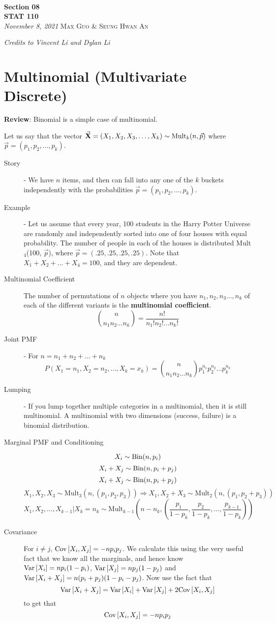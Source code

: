 \documentclass[11pt]{article}
\theoremstyle{definition}
\theoremstyle{remark}
\newcommand{\cov}[2]{\textnormal{Cov}\left[ #1, #2 \right]}
\renewcommand{\var}[1]{\textnormal{Var}\left[ #1 \right]}
\newcommand{\Bin}{\textnormal{Bin}}
\newcommand{\Mult}{\textrm{Mult}}
\newcommand{\inserttitle}{Section 08}
\newcommand{\insertauthor}{Max Guo \& Seung Hwan An}
\newcommand{\insertcourse}{STAT 110}
\begin{document}
{\noindent\Huge\bf  \\[0.1\baselineskip] {\inserttitle }}\\[2\baselineskip]
{{\bf \insertcourse}\\ {\textit{November 8, 2021}}} \hfill {\large \textsc{\insertauthor}}
\smallskip

\hfill \noindent \textit{Credits to Vincent Li and Dylan Li}

\section{Multinomial (Multivariate Discrete)}

	\textbf{Review}: Binomial is a simple case of multinomial.
	
	Let us say that the vector $\vec{\textbf{X}} = (X_1, X_2, X_3, \dots, X_k) \sim \textnormal{Mult}_k(n, \vec{p})$  where $\vec{p} = (p_1, p_2, \dots, p_k)$.
\begin{description}
	\item[Story] - We have $n$ items, and then can fall into any one of the $k$ buckets independently with the probabilities $\vec{p} = (p_1, p_2, \dots, p_k)$.
	\item[Example] - Let us assume that every year, 100 students in the Harry Potter Universe are randomly and independently sorted into one of four houses with equal probability. The number of people in each of the houses is distributed Mult$_4$(100, $\vec{p}$), where $\vec{p} = (.25, .25, .25, .25)$.
		Note that $X_1 + X_2 + \dots + X_4 = 100$, and they are dependent.
	\item[Multinomial Coefficient] The number of permutations of $n$ objects where you have $n_1, n_2, n_3 \dots, n_k$ of each of the different variants is the \textbf{multinomial coefficient}.
		\[{n \choose n_1n_2\dots n_k} = \frac{n!}{n_1!n_2!\dots n_k!}\]
	\item[Joint PMF] - For $n = n_1 + n_2 + \dots + n_k$
		\[P(X_1 = n_1, X_2 = n_2, \dots, X_k = x_k) = {n \choose n_1n_2\dots n_k}p_1^{n_1}p_2^{n_2}\dots p_k^{n_k}\]
	\item[Lumping] - If you lump together multiple categories in a multinomial, then it is still multinomial. A multinomial with two dimensions (success, failure) is a binomial distribution.
	\item[Marginal PMF and Conditioning]
		\[X_i \sim \Bin(n, p_i)\]
		\[X_i + X_j \sim \Bin(n, p_i + p_j)\]
		\[X_i + X_j \sim \Bin(n, p_i + p_j)\]
		\[X_1, X_2, X_3 \sim \Mult_3(n, (p_1, p_2, p_3)) \Longrightarrow X_1, X_2 + X_3 \sim \Mult_2(n, (p_1, p_2 + p_3))\]
		\[X_1, X_2, \dots, X_{k-1} | X_k = n_k \sim \Mult_{k-1}\left(n - n_k, \left(\frac{p_1}{1 - p_k}, \frac{p_2}{1 - p_k}, \dots, \frac{p_{k-1}}{1 - p_k}\right)\right)\]
	\item[Covariance] For $i \neq j$, $\cov{X_i}{X_j} = - n p_i p_j$. We calculate this using the very useful fact that we know all the marginals, and hence know $\var{X_i} = n p_i (1-p_i)$, $\var{X_j}=n p_j (1-p_j)$ and $\var{X_i+X_j} = n (p_i+p_j) (1-p_i-p_j)$. Now use the fact that $$ \var{X_i + X_j} = \var{X_i} + \var{X_j} + 2 \cov{X_i}{X_j}$$ to get that $$\cov{X_i}{X_j} = - n p_i p_j $$
\end{description}
\end{document}
